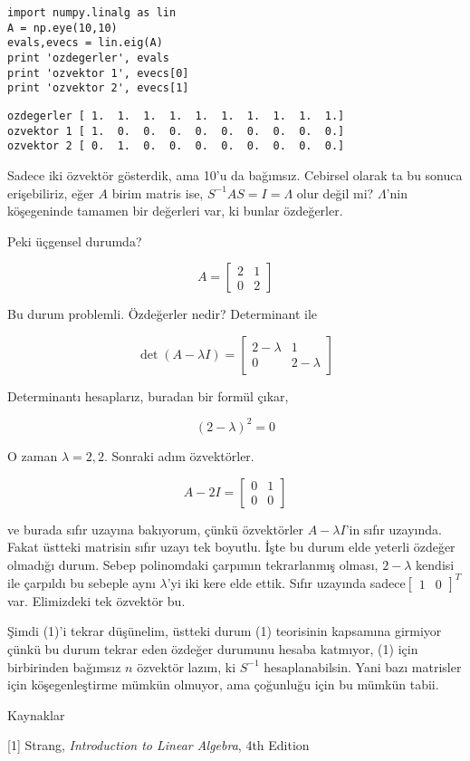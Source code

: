 \documentclass[12pt,fleqn]{article}\usepackage{../../common}
\begin{document}
\begin{verbatim}
import numpy.linalg as lin
A = np.eye(10,10)
evals,evecs = lin.eig(A)
print 'ozdegerler', evals
print 'ozvektor 1', evecs[0]
print 'ozvektor 2', evecs[1]
\end{verbatim}

\begin{verbatim}
ozdegerler [ 1.  1.  1.  1.  1.  1.  1.  1.  1.  1.]
ozvektor 1 [ 1.  0.  0.  0.  0.  0.  0.  0.  0.  0.]
ozvektor 2 [ 0.  1.  0.  0.  0.  0.  0.  0.  0.  0.]
\end{verbatim}

Sadece iki özvektör gösterdik, ama 10'u da bağımsız. Cebirsel olarak ta bu
sonuca erişebiliriz, eğer $A$ birim matris ise, $ S^{-1}AS = I = \Lambda $
olur değil mi? $\Lambda$'nin köşegeninde tamamen bir değerleri var, ki
bunlar özdeğerler. 

Peki üçgensel durumda? 

$$ A = \left[\begin{array}{rr}
2 &  1 \\ 0 & 2
\end{array}\right] $$

Bu durum problemli. Özdeğerler nedir? Determinant ile

$$ \det (A-\lambda I) = 
 \left[\begin{array}{rr}
2-\lambda &  1 \\ 0 & 2-\lambda
\end{array}\right]
$$

Determinantı hesaplarız, buradan bir formül çıkar, 

$$ (2-\lambda)^2 = 0 $$

O zaman $\lambda=2,2$. Sonraki adım özvektörler.

$$ A-2I = 
\left[\begin{array}{rr}
0 &  1 \\ 0 & 0
\end{array}\right]
$$

ve burada sıfır uzayına bakıyorum, çünkü özvektörler $A-\lambda I$'in sıfır
uzayında. Fakat üstteki matrisin sıfır uzayı tek boyutlu. İşte bu durum
elde yeterli özdeğer olmadığı durum. Sebep polinomdaki çarpımın
tekrarlanmış olması, $2-\lambda$ kendisi ile çarpıldı bu sebeple aynı
$\lambda$'yi iki kere elde ettik. Sıfır uzayında sadece$\left[\begin{array}{cc} 1 & 0 \end{array}\right]^T$ var. Elimizdeki 
tek özvektör bu. 

Şimdi (1)'i tekrar düşünelim, üstteki durum (1) teorisinin kapsamına
girmiyor çünkü bu durum tekrar eden özdeğer durumunu hesaba katmıyor, (1)
için birbirinden bağımsız $n$ özvektör lazım, ki $S^{-1}$
hesaplanabilsin. Yani bazı matrisler için köşegenleştirme mümkün olmuyor,
ama çoğunluğu için bu mümkün tabii.


Kaynaklar 

[1] Strang, {\em Introduction to Linear Algebra}, 4th Edition
\end{document}
